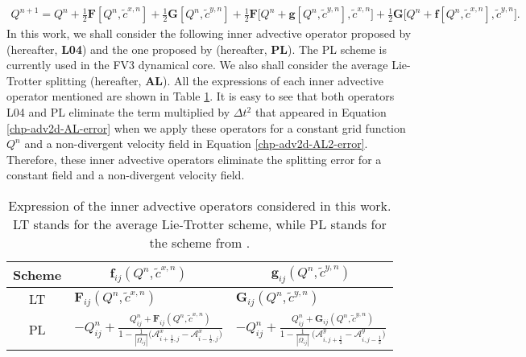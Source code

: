 \begin{align*}
	Q^{n+1} = Q^n + \frac{1}{2}\mathbf{F}[Q^n,\tilde{c}^{x,n}] + \frac{1}{2}\mathbf{G}[Q^n,\tilde{c}^{y,n}] + 
    \frac{1}{2}\mathbf{F}\bigg[Q^n + \mathbf{g}[Q^n, \tilde{c}^{y,n}], \tilde{c}^{x,n}\bigg]+
    \frac{1}{2}\mathbf{G}\bigg[Q^n + \mathbf{f}[Q^n, \tilde{c}^{x,n}], \tilde{c}^{y,n}\bigg].
\end{align*}
In this work, we shall consider the following inner advective operator proposed by
\citet{lin:2004} (hereafter, \textbf{L04}) and the one proposed by \citet{putman:2007} (hereafter, \textbf{PL}).
The PL scheme is currently used in the FV3 dynamical core.
We also shall consider the average Lie-Trotter splitting (hereafter, \textbf{AL}). 
All the expressions of each inner advective operator mentioned are shown in Table \ref{chp-adv2d-tab1}.
It is easy to see that both operators {L04} and {PL} eliminate the term multiplied by
$\Delta t^2$ that appeared in Equation \eqref{chp-adv2d-AL-error} when we apply these operators for a 
constant grid function $Q^n$ and a non-divergent velocity field in Equation \eqref{chp-adv2d-AL2-error}.
Therefore, these inner advective operators eliminate the splitting error for a constant field and a non-divergent velocity field.
\begin{table}[!h]
	\begin{tabular}{|c|l|l|}
		\hline
		Scheme & \multicolumn{1}{c|}{$\mathbf{f}_{ij}(Q^n, \tilde{c}^{x,n})$}
		       & \multicolumn{1}{c|}{$\mathbf{g}_{ij}(Q^n, \tilde{c}^{y,n})$} \\ \hline
		LT   & $\mathbf{F}_{ij}(Q^n,\tilde{c}^{x,n})$ 
		       & $\mathbf{G}_{ij}(Q^n,\tilde{c}^{y,n})$ \\ \hline
		PL   & $-Q_{ij}^n +
		         \frac{Q_{ij}^n  + \mathbf{F}_{ij}(Q^n,\tilde{c}^{x,n})}
			   {1 - \frac{1}{|\Omega_{ij}|}\big(\mathcal{A}_{i+\frac{1}{2},j}^{x} - \mathcal{A}_{i-\frac{1}{2},j}^{x}\big)}$
			   & $-Q_{ij}^n +
			 \frac{Q_{ij}^n  + \mathbf{G}_{ij}(Q^n,\tilde{c}^{y,n})}
			   {1 - \frac{1}{|\Omega_{ij}|}\ \big(\mathcal{A}_{i,j+\frac{1}{2}}^{y} - \mathcal{A}_{i,j-\frac{1}{2}}^{y}\big)}$
			   \\ \hline
	\end{tabular}
\caption{Expression of the inner advective operators considered in this work.
LT stands for the average Lie-Trotter  scheme, while PL stands for the scheme from \citet{putman:2007}.}
\label{chp-adv2d-tab1}
\end{table}

